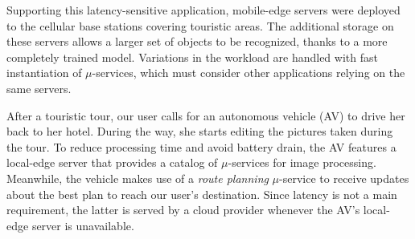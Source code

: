 
Supporting this latency-sensitive application, mobile-edge servers were deployed to the cellular base stations covering touristic areas. The additional storage on these servers allows a larger set of objects to be recognized, thanks to a more completely trained model. Variations in the workload are handled with fast instantiation of $\mu$-services, which must consider other applications relying on the same servers.


After a touristic tour, our user calls for an autonomous vehicle (AV) to drive her back to her hotel. During the way, she starts editing the pictures taken during the tour. To reduce processing time and avoid battery drain, the AV features a local-edge server that provides a catalog of $\mu$-services for image processing. Meanwhile, the vehicle makes use of a \textit{route planning} $\mu$-service
to receive updates about the best plan to reach our user's destination. Since latency is not a main requirement, the latter is served by a cloud provider whenever the AV's local-edge server is unavailable. 





